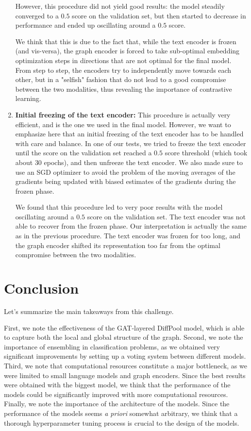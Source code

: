 \documentclass[switch, 11pt]{article}
\begin{document}
\begin{multicols}{2}
\begin{enumerate}
              However, this procedure did not yield good results: the model steadily converged to a $0.5$ score on the validation set, but then started to decrease in performance and ended up oscillating around a $0.5$ score.

              We think that this is due to the fact that, while the text encoder is frozen (and vis-versa), the graph encoder is forced to take sub-optimal embedding optimization steps in directions that are not optimal for the final model. From step to step, the encoders try to independently move towards each other, but in a "selfish" fashion that do not lead to a good compromise between the two modalities, thus revealing the importance of contrastive learning.
        \item \textbf{Initial freezing of the text encoder: } This procedure is actually very efficient, and is the one we used in the final model. However, we want to emphasize here that an initial freezing of the text encoder has to be handled with care and balance. In one of our tests, we tried to freeze the text encoder until the score on the validation set reached a $0.5$ score threshold (which took about $30$ epochs), and then unfreeze the text encoder. We also made sure to use an SGD optimizer to avoid the problem of the moving averages of the gradients being updated with biased estimates of the gradients during the frozen phase.

              We found that this procedure led to very poor results with the model oscillating around a $0.5$ score on the validation set. The text encoder was not able to recover from the frozen phase. Our interpretation is actually the same as in the previous procedure. The text encoder was frozen for too long, and the graph encoder shifted its representation too far from the optimal compromise between the two modalities.

    \end{enumerate}

    \section{Conclusion}
    Let's summarize the main takeaways from this challenge.

    First, we note the effectiveness of the GAT-layered DiffPool model, which is able to capture both the local and global structure of the graph.
    Second, we note the importance of ensembling in classification problems, as we obtained very significant improvements by setting up a voting system between different models. Third, we note that computational resources constitute a major bottleneck, as we were limited to small language models and graph encoders. Since the best results were obtained with the biggest model, we think that the performance of the models could be significantly improved with more computational resources. Finally, we note the importance of the architecture of the models. Since the performance of the models seems \textit{a priori} somewhat arbitrary, we think that a thorough hyperparameter tuning process is crucial to the design of the models.


\end{multicols}
\end{document}
